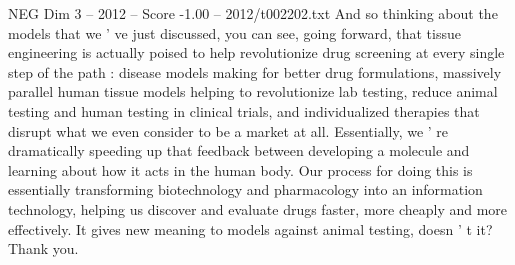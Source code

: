 \begin{textsample}{NEG Dim 3 – 2012 – Score -1.00 – 2012/t002202.txt}
And so thinking about the models that we ' ve just discussed, you can see, going forward, that tissue engineering is actually poised to help revolutionize drug screening at every single step of the path : disease models making for better drug formulations, massively parallel human tissue models helping to revolutionize lab testing, reduce animal testing and human testing in clinical trials, and individualized therapies that disrupt what we even consider to be a market at all.
Essentially, we ' re dramatically speeding up that feedback between developing a molecule and learning about how it acts in the human body.
Our process for doing this is essentially transforming biotechnology and pharmacology into an information technology, helping us discover and evaluate drugs faster, more cheaply and more effectively.
It gives new meaning to models against animal testing, doesn ' t it?
Thank you.

\end{textsample}

